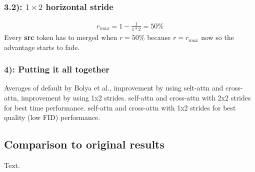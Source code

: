 \subsubsection*{3.2): $1 \times 2$ horizontal stride}
\begin{align*}
    r_{max} = 1-\frac{1}{1*2} = 50\%
\end{align*}
Every  \textbf{src} token has to merged when \(r=50\%\) because \(r=r_{max}\) now so the advantage starts to fade.

\begin{figure}[!htb]
    
    
\end{figure}

\newpage
\subsubsection*{4): Putting it all together}
Averages of default by Bolya et al.\cite{bolya2023tomesd}, improvement by using selt-attn and cross-attn, improvement by using 1x2 strides. 
self-attn and cross-attn with 2x2 strides for best time performance. self-attn and cross-attn with 1x2 strides for best quality (low FID) performance.
\begin{figure}[!htb]
    
    
\end{figure}

\newpage
\subsection{Comparison to original results}
Text.